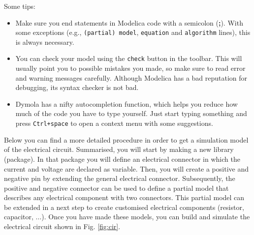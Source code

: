 \documentclass[10pt,a4paper]{article}
\begin{document}
\vspace{3 mm}
Some tips:
\begin{itemize}
	\item Make sure you end statements in Modelica code with a semicolon (\textbf{;}). With some exceptions (e.g., \texttt{(partial) model}, \texttt{equation} and \texttt{algorithm} lines), this is always necessary.
	\item You can check your model using the \texttt{check} button in the toolbar. This will usually point you to possible mistakes you made, so make sure to read error and warning messages carefully. Although Modelica has a bad reputation for debugging, its syntax checker is not bad.
	\item Dymola has a nifty autocompletion function, which helps you reduce how much of the code you have to type yourself. Just start typing something and press \texttt{Ctrl+space} to open a context menu with some suggestions.
\end{itemize}
\vspace{5 mm}

Below you can find a more detailed procedure in order to get a simulation model of the electrical circuit. Summarised, you will start by making a new library (package). In that package you will define an electrical connector in which the current and voltage are declared as variable. Then, you will create a positive and negative pin by extending the general electrical connector. Subsequently, the positive and negative connector can be used to define a partial model that describes any electrical component with two connectors. This partial model can be extended in a next step to create customised electrical components (resistor, capacitor, ...). Once you have made these models, you can build and simulate the electrical circuit shown in Fig. \ref{fig:cir}.
\vspace{5 mm}
\end{document}
